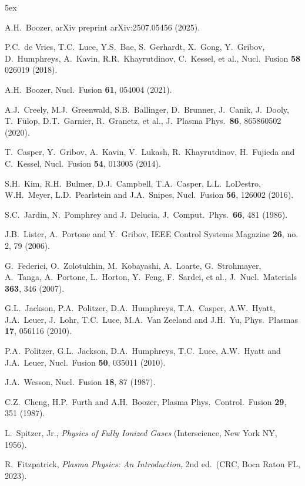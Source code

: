 \documentclass[12pt,prb,aps]{revtex4-1}
\begin{document}
\begin{thebibliography}{99}\baselineskip 5ex

   A.H.~Boozer, arXiv preprint arXiv:2507.05456 (2025).

 P.C.~de Vries, T.C.~Luce, Y.S.~Bae, S.~Gerhardt, X.~Gong, Y.~Gribov, 
D.~Humphreys, A.~Kavin, R.R.~Khayrutdinov, C.~Kessel, et al., Nucl.\ Fusion {\bf 58} 026019 (2018).

 A.H.~Boozer, Nucl.\ Fusion {\bf 61}, 054004 (2021). 

 A.J.~Creely, M.J.~Greenwald, S.B.~Ballinger, D.~Brunner, J.~Canik, J.~Dooly, 
T.~F\"{u}lop, D.T.~Garnier, R.~Granetz, et al.,  J.\ Plasma Phys.\ {\bf 86}, 865860502 (2020).

 T.~Casper, Y.~Gribov, A.~Kavin, V.~Lukash, R.~Khayrutdinov, H.~Fujieda and C.~Kessel, Nucl.\ Fusion {\bf 54}, 013005 (2014).

 S.H.~Kim, R.H.~Bulmer, D.J.~Campbell, T.A.~Casper, L.L.~LoDestro, W.H.~Meyer, L.D.~Pearlstein and J.A.~Snipes,
Nucl.\ Fusion {\bf 56}, 126002 (2016).

 S.C.~Jardin, N.~Pomphrey and J.~Delucia, J.\ Comput.\ Phys.\ {\bf 66}, 481 (1986).

 J.B.~Lister, A.~Portone and Y.~Gribov, IEEE Control Systems Magazine {\bf 26}, no. 2, 79 (2006).

 G.~Federici, O.~Zolotukhin, M.~Kobayashi, A.~Loarte, G.~Strohmayer, A.~Tanga, A.~Portone, L.~Horton,
Y.~Feng, F.~Sardei, et al., J.\ Nucl.\ Materials {\bf 363}, 346 (2007). 

 G.L.~Jackson, P.A.~Politzer, D.A.~Humphreys, T.A.~Casper, A.W.~Hyatt, J.A.~Leuer, J.~Lohr,
T.C.~Luce, M.A.~Van Zeeland and J.H.~Yu, Phys.\ Plasmas {\bf 17}, 056116 (2010).

 P.A.~Politzer, G.L.~Jackson, D.A.~Humphreys, T.C.~Luce, A.W.~Hyatt and J.A.~Leuer, Nucl.\ Fusion {\bf 50}, 035011 (2010).

 J.A.~Wesson, Nucl.\ Fusion {\bf 18}, 87 (1987).

 C.Z.~Cheng, H.P.~Furth and A.H.~Boozer, Plasma Phys.\ Control.\ Fusion {\bf 29}, 351 (1987).

 L.~Spitzer, Jr., {\em Physics of Fully Ionized Gases}\/ (Interscience, New York NY, 1956).

 R.~Fitzpatrick, {\em Plasma Physics: An Introduction}, 2nd ed.\ (CRC, Boca Raton FL, 2023).


\end{thebibliography}
\end{document}

